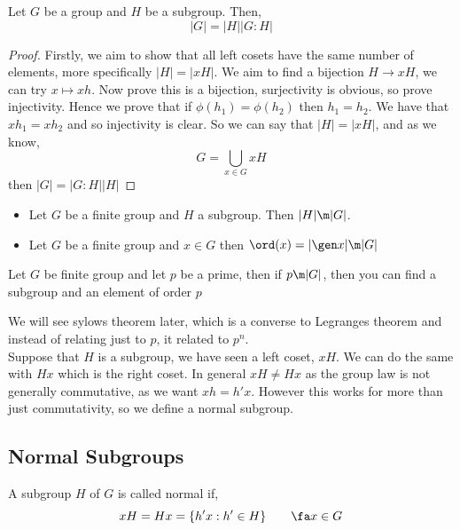 \begin{nthm}
  Let $G$ be a group and $H$ be a subgroup. Then,
  $$ |G| = |H||G : H| $$
\end{nthm}
\begin{proof}
  Firstly, we aim to show that all left cosets have the same number of elements, more specifically $|H| = |xH|$. We aim to find a bijection $H \to xH$, we can try $x \mapsto xh$. Now prove this is a bijection, surjectivity is obvious, so prove injectivity. Hence we prove that if $\phi(h_1) = \phi(h_2)$ then $h_1 = h_2$. We have that $xh_1 = xh_2$ and so injectivity is clear. So we can say that $|H| = |xH|$, and as we know,
  $$ G = \bigcup_{x \in G} xH $$
  then $|G| = |G : H||H|$
\end{proof}

\begin{ncor}
  \begin{itemize}
    \item Let $G$ be a finite group and $H$ a subgroup. Then $|H| \m |G|$.
    \item Let $G$ be a finite group and $x \in G$ then $\ord (x) = |\gen x| \m |G|$
  \end{itemize}
\end{ncor}

\begin{nthm}
  Let $G$ be finite group and let $p$ be a prime, then if $p \m |G|$, then you can find a subgroup and an element of order $p$
\end{nthm}
We will see sylows theorem later, which is a converse to Legranges theorem and instead of relating just to $p$, it related to $p^n$.\\

Suppose that $H$ is a subgroup, we have seen a left coset, $xH$. We can do the same with $Hx$ which is the right coset. In general $xH \ne Hx$ as the group law is not generally commutative, as we want $xh = h'x$. However this works for more than just commutativity, so we define a normal subgroup.

\subsection{Normal Subgroups}

\begin{ndefi}
  A subgroup $H$ of $G$ is called normal if,
  $$ xH = Hx = \{h'x : h' \in H\} \qquad \fa x \in G $$
\end{ndefi}

